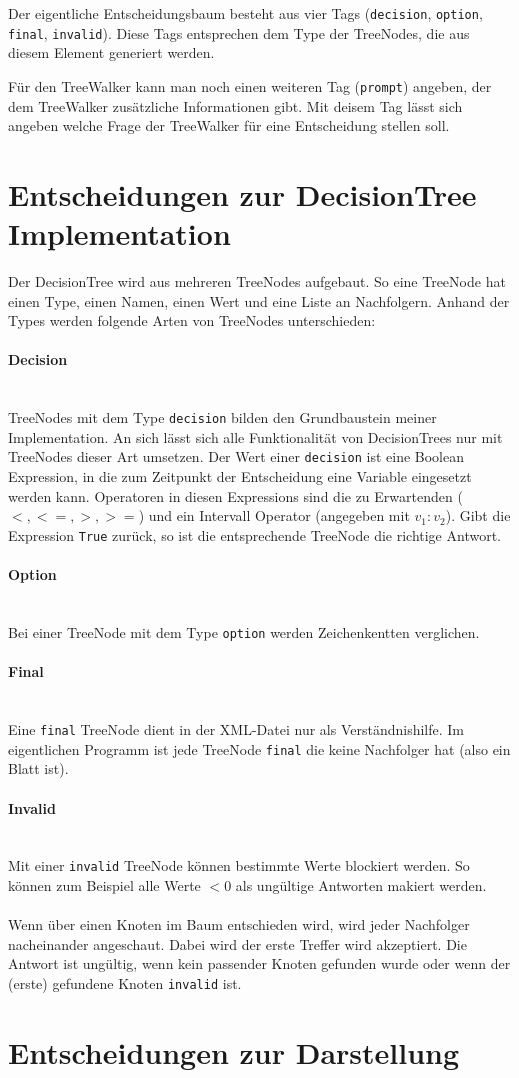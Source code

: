 \documentclass[a4paper,12pt]{article}
\newcommand{\myparagraph}[1]{\paragraph*{#1}\mbox{}\\}
\begin{document}
Der eigentliche Entscheidungsbaum besteht aus vier Tags (\texttt{decision}, \texttt{option}, \texttt{final}, \texttt{invalid}).
Diese Tags entsprechen dem Type der TreeNodes, die aus diesem Element generiert werden.

Für den TreeWalker kann man noch einen weiteren Tag (\verb+prompt+) angeben, der dem TreeWalker zusätzliche Informationen gibt. Mit deisem Tag lässt sich angeben welche Frage der TreeWalker für eine Entscheidung stellen soll. 


\section*{Entscheidungen zur DecisionTree Implementation}
Der DecisionTree wird aus mehreren TreeNodes aufgebaut. So eine TreeNode hat einen Type, einen Namen, einen Wert und eine Liste an Nachfolgern. Anhand der Types werden folgende Arten von TreeNodes unterschieden:

\myparagraph{Decision}
TreeNodes mit dem Type \texttt{decision} bilden den Grundbaustein meiner Implementation. An sich lässt sich alle Funktionalität von DecisionTrees nur mit TreeNodes dieser Art umsetzen.
Der Wert einer \texttt{decision} ist eine Boolean Expression, in die zum Zeitpunkt der Entscheidung eine Variable eingesetzt werden kann. Operatoren in diesen Expressions sind die zu Erwartenden ($<, <=, >, >=$) und ein Intervall Operator (angegeben mit $v_1:v_2$). Gibt die Expression \texttt{True} zurück, so ist die entsprechende TreeNode die richtige Antwort. 

\myparagraph{Option}
Bei einer TreeNode mit dem Type \texttt{option} werden Zeichenkentten verglichen. 

\myparagraph{Final}
Eine \texttt{final} TreeNode dient in der XML-Datei nur als Verständnishilfe. Im eigentlichen Programm ist jede TreeNode \texttt{final} die keine Nachfolger hat (also ein Blatt ist). 

\myparagraph{Invalid}
Mit einer \texttt{invalid} TreeNode können bestimmte Werte blockiert werden. So können zum Beispiel alle Werte $<0$ als ungültige Antworten makiert werden.
\\
\\
Wenn über einen Knoten im Baum entschieden wird, wird jeder Nachfolger nacheinander angeschaut. Dabei wird der erste Treffer wird akzeptiert. Die Antwort ist ungültig, wenn kein passender Knoten gefunden wurde oder wenn der (erste) gefundene Knoten \texttt{invalid} ist. 

\section*{Entscheidungen zur Darstellung}
\end{document}
